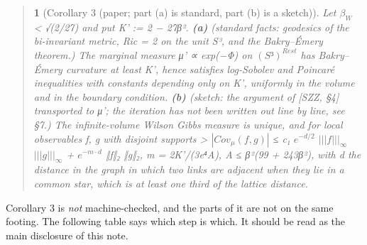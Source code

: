 \documentclass[11pt,a4paper]{article}
\theoremstyle{named}
\newtheorem*{namedthm}{}
\begin{document}
\begin{quote}
\begin{namedthm}[Corollary 3 (paper; part (a) is standard, part (b) is a sketch)]
Let $β_W$ \textless{} √(2/27) and put K' := 2 − 27β². \textbf{(a)} \textit{(standard facts: geodesics of the bi-invariant metric, Ric = 2 on the unit S³, and the Bakry–Émery theorem.)} The marginal measure μ' ∝ exp(−Φ) on $(S³)^{Rest}$ has Bakry–Émery curvature at least K', hence satisfies log-Sobolev and Poincaré inequalities with constants depending only on K', uniformly in the volume and in the boundary condition. \textbf{(b)} \textit{(sketch: the argument of [SZZ, §4] transported to μ'; the iteration has not been written out line by line, see §7.)} The infinite-volume Wilson Gibbs measure is unique, and for local observables f, g with disjoint supports \textgreater{} $|Cov_{μ}(f,g)|$ ≤ c₁ $e^{−d/2}$ $|||f|||_{∞}$ $|||g|||_{∞}$ + $e^{−m·d}$ ‖f‖₂ ‖g‖₂,  m = 2K'/(3e⁴A),  A ≤ β²(99 + 243β²), with d the distance in the graph in which two links are adjacent when they lie in a common star, which is at least one third of the lattice distance.
\end{namedthm}
\end{quote}
Corollary 3 is \textit{not} machine-checked, and the parts of it are not on the same footing. The following table says which step is which. It should be read as the main disclosure of this note.
\end{document}
